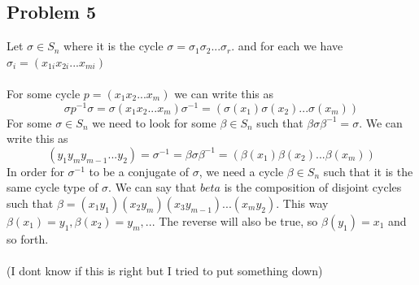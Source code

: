 \documentclass[12pt]{article}
\begin{document}
\subsection*{Problem 5}
Let $\sigma \in S_n$ where it is the cycle $\sigma = \sigma_1 \sigma_2 ... \sigma_r$. and for each we have $\sigma_i = (x_{1i}x_{2i}...x_{mi})$\\\\
For some cycle $p = (x_1x_2...x_m)$ we can write this as
\[
	\sigma p^{-1}\sigma = \sigma(x_1x_2...x_m)\sigma^{-1} = (\sigma(x_1)\sigma(x_2)...\sigma(x_m))
\]
For some $\sigma \in S_n$ we need to look for some $\beta \in S_n$ such that $\beta \sigma \beta^{-1} = \sigma$. We can write this as
\[
	(y_1y_my_{m-1}...y_2) = \sigma^{-1} = \beta \sigma \beta^{-1} = (\beta(x_1)\beta(x_2)...\beta(x_m))
\]
In order for $\sigma^{-1}$ to be a conjugate of $\sigma$, we need a cycle $\beta \in S_n$ such that it is the same cycle type of $\sigma$. We can say that $beta$ is the composition of disjoint cycles such that $\beta = (x_1y_1)(x_2y_m)(x_3y_{m-1})...(x_my_2)$. This way $\beta(x_1) = y_1, \beta(x_2) = y_m,...$ The reverse will also be true, so $\beta(y_1) = x_1$ and so forth.\\\\
 (I dont know if this is right but I tried to put something down)
\newpage
\end{document}
